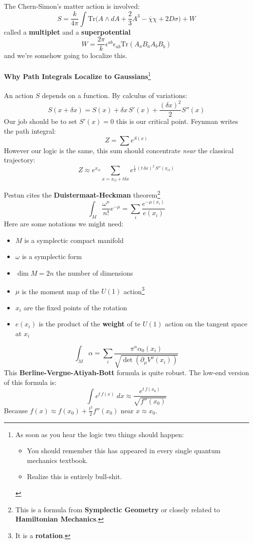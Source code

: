 \documentclass[12pt]{article}
\begin{document}
\noindent The Chern-Simon's matter action is involved:
$$ S =  \frac{k}{4\pi} 
\int \text{Tr} \big( A \wedge dA + \frac{2}{3} A^3 - \overline{\chi}\chi + 2D \sigma \big) +W $$
called a \textbf{multiplet} and a \textbf{superpotential} 
$$W = \frac{2\pi}{k} \epsilon^{ab} \epsilon_{\dot{a}\dot{b}}
\text{Tr}
(A_a B_{\dot{a}}
A_b B_{\dot{b}}) $$
and we're somehow going to localize this. \\ \\
\textbf{Why Path Integrals Localize to Gaussians}\footnote{
As soon as you hear the logic two things should happen:
\begin{itemize}
\item You should remember this has appeared in every single quantum mechanics textbook.
\item Realize this is entirely bull-shit.
\end{itemize}}\\ \\
An action $S$ depends on a function.  By calculus of variations:
$$ S(x + \delta x) = S(x) + \delta x \, S'(x) + \frac{(\delta x)^2}{2} S''(x)$$
Our job should be to set $\boxed{S'(x) = 0}$ this is our critical point.  Feynman writes the path integral:
$$ Z = \sum e^{S(x)} $$
However our logic is the same, this sum should concentrate \textit{near} the classical trajectory:
$$ Z \approx e^{x_\text{cl}} \sum_{x = x_\text{cl} + t \delta x}  e^{ \frac{1}{2}\, (t\, \delta x)^2 \,S''(x_\text{cl})}$$
\newpage

\noindent Pestun cites the \textbf{Duistermaat-Heckman} theorem\footnote{This is a formula from \textbf{Symplectic Geometry} or closely related to \textbf{Hamiltonian Mechanics}.  }
$$ \int_M \frac{\omega^n}{n!} e^{-\mu} = \sum_i \frac{e^{-\mu(x_i)}}{e(x_i)} $$
Here are some notations we might need:
\begin{itemize}
\item $M$ is a symplectic compact manifold
\item $\omega$ is a symplectic form
\item $\dim M = 2n$ the number of dimensions
\item $\mu$ is the moment map of the $U(1)$ action\footnote{It is a \textbf{rotation}.}
\item $x_i$ are the fixed points of the rotation
\item $e(x_i)$ is the product of the \textbf{weight} of te $U(1)$ action on the tangent space at $x_i$ 
\end{itemize}
$$ \int_M \alpha = \sum_i \frac{\pi^n \alpha_0(x_i)}{\sqrt{\det(\partial_\mu V^\nu (x_i))}}$$
This \textbf{Berline-Vergne-Atiyah-Bott} formula is quite robust.  The low-end version of this formula is:
$$ \int e^{t\, f(x)}\; dx \approx \frac{e^{t \, f(x_0)}}{\sqrt{f''(x_0)}} $$
Because $f(x) \approx f(x_0) + \frac{t^2}{2} f''(x_0)$ near $x \approx x_0$.
\newpage
\end{document}
